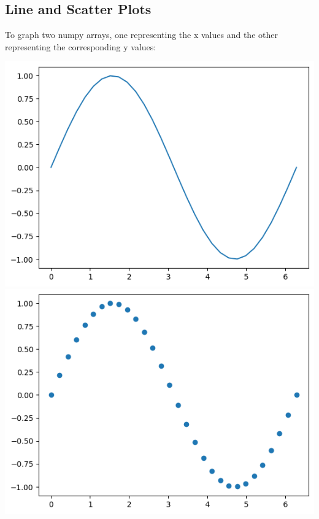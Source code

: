 \subsection{Line and Scatter Plots}
To graph two numpy arrays, one representing the x values and the other representing the corresponding y values:
\begin{minipage}{0.49\linewidth}
    
\end{minipage}
\begin{minipage}{0.49\linewidth}
    \includegraphics[width = \linewidth]{src/5_matplotlib/images/line_plot.png}
    \includegraphics[width = \linewidth]{src/5_matplotlib/images/scatter_plot.png}
\end{minipage}
